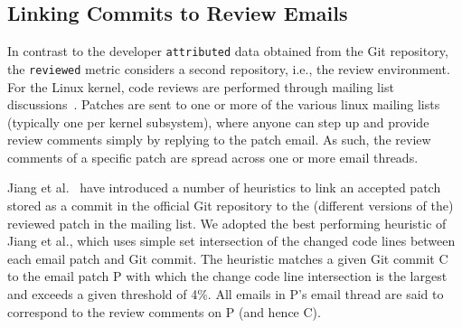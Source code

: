 





\subsection{Linking Commits to Review Emails}
\label{sec:link-comm-revi}

In contrast to the developer \texttt{attributed} data obtained from the Git repository, the \texttt{reviewed} metric considers a second repository, i.e., the review environment. For the Linux kernel, code reviews are performed through mailing list discussions~\citep{icst17,msr13jojo,jiang14}. %
Patches are sent to one or more of the various linux mailing lists (typically one per kernel subsystem), where anyone can step up and provide review comments simply by replying to the patch email. As such, the review comments of a specific patch are spread across one or more email threads.

Jiang et al.~\citep{msr13jojo,jiang14} have introduced a number of heuristics to link an accepted patch stored as a commit in the official Git repository to the (different versions of the) reviewed patch in the mailing list. We adopted the best performing heuristic of Jiang et al., which %
uses simple set intersection of the changed code lines between each email patch and Git commit. The heuristic matches a given Git commit C to the email patch P with which the change code line intersection is the largest and exceeds a given threshold of 4\%. All emails in P's email thread are said to correspond to the review comments on P (and hence C).%

